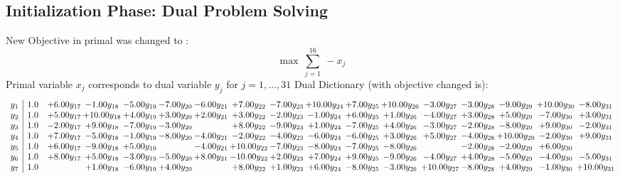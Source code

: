 \documentclass[9pt]{article}
\begin{document}
\subsection{Initialization Phase: Dual Problem Solving}
New Objective in primal was changed to : \[ \max\ \sum_{j=1}^{16}\ - x_j \] 
Primal variable $x_j$ corresponds to dual variable $y_j$ for $j = 1,\ldots,31$
Dual Dictionary (with objective changed is): 
\[\begin{array}{c| c c@{\hskip 2pt} c@{\hskip 2pt} c@{\hskip 2pt} c@{\hskip 2pt} c@{\hskip 2pt} c@{\hskip 2pt} c@{\hskip 2pt} c@{\hskip 2pt} c@{\hskip 2pt} c@{\hskip 2pt} c@{\hskip 2pt} c@{\hskip 2pt} c@{\hskip 2pt} c@{\hskip 2pt} c@{\hskip 2pt} }
 y_{1}   &  1.0 & +  6.00 y_{17} & -1.00 y_{18} & -5.00 y_{19} & -7.00 y_{20} & -6.00 y_{21} & +  7.00 y_{22} & -7.00 y_{23} & + 10.00 y_{24} & +  7.00 y_{25} & + 10.00 y_{26} & -3.00 y_{27} & -3.00 y_{28} & -9.00 y_{29} & + 10.00 y_{30} & -8.00 y_{31}\\
 y_{2}   &  1.0 & +  5.00 y_{17} & + 10.00 y_{18} & +  4.00 y_{19} & +  3.00 y_{20} & +  2.00 y_{21} & +  3.00 y_{22} & -2.00 y_{23} & -1.00 y_{24} & +  6.00 y_{25} & +  1.00 y_{26} & -4.00 y_{27} & +  3.00 y_{28} & +  5.00 y_{29} & -7.00 y_{30} & +  3.00 y_{31}\\
 y_{3}   &  1.0 & -2.00 y_{17} & +  9.00 y_{18} & -7.00 y_{19} & -3.00 y_{20} &   & +  8.00 y_{22} & -9.00 y_{23} & +  1.00 y_{24} & -7.00 y_{25} & +  4.00 y_{26} & -3.00 y_{27} & -2.00 y_{28} & -8.00 y_{29} & +  9.00 y_{30} & -2.00 y_{31}\\
 y_{4}   &  1.0 & +  7.00 y_{17} & -5.00 y_{18} & -1.00 y_{19} & -8.00 y_{20} & -4.00 y_{21} & -2.00 y_{22} & -4.00 y_{23} & -6.00 y_{24} & -6.00 y_{25} & +  3.00 y_{26} & +  5.00 y_{27} & -4.00 y_{28} & + 10.00 y_{29} & -2.00 y_{30} & +  9.00 y_{31}\\
 y_{5}   &  1.0 & +  6.00 y_{17} & -9.00 y_{18} & +  5.00 y_{19} &   & -4.00 y_{21} & + 10.00 y_{22} & -7.00 y_{23} & -8.00 y_{24} & -7.00 y_{25} & -8.00 y_{26} &   & -2.00 y_{28} & -2.00 y_{29} & +  6.00 y_{30} &   \\
 y_{6}   &  1.0 & +  8.00 y_{17} & +  5.00 y_{18} & -3.00 y_{19} & -5.00 y_{20} & +  8.00 y_{21} & -10.00 y_{22} & +  2.00 y_{23} & +  7.00 y_{24} & +  9.00 y_{25} & -9.00 y_{26} & -4.00 y_{27} & +  4.00 y_{28} & -5.00 y_{29} & -4.00 y_{30} & -5.00 y_{31}\\
 y_{7}   &  1.0  &   & +  1.00 y_{18} & -6.00 y_{19} & +  4.00 y_{20} &   & +  8.00 y_{22} & +  1.00 y_{23} & +  6.00 y_{24} & -8.00 y_{25} & -3.00 y_{26} & + 10.00 y_{27} & -8.00 y_{28} & +  4.00 y_{29} & -1.00 y_{30} & + 10.00 y_{31}\\

\end{array}\]
\end{document}
